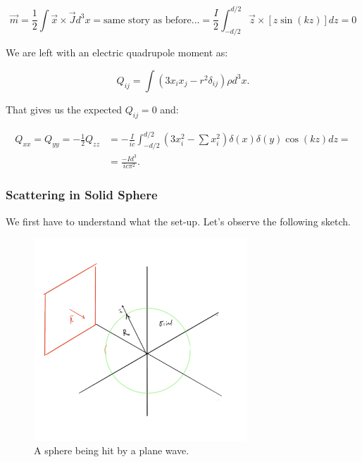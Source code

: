 \begin{equation}
	\vec{m}=\frac{1}{2} \int \vec{x} \times \vec{J} d^{3} x= \text{same story as before...}=\frac{I}{2} \int_{-d / 2}^{d / 2} \vec{z} \times[\hat{z} \sin (k z)] d z=0
\end{equation}

We are left with an electric quadrupole moment as:

\begin{equation}
	Q_{i j}=\int\left(3 x_{i} x_{j}-r^{2} \delta_{i j}\right) \rho d^{3} x.
\end{equation}

That gives us the expected $Q_{ij} = 0$ and:

\begin{equation}
	\begin{split}
		Q_{xx} = Q_{yy} = -\tfrac{1}{2} Q_{zz} &= -\frac{  I}{ic} \int_{-d / 2}^{d / 2} (3x_{i}^{2} - \sum x_{i}^{2})  \delta(x)\delta(y)\cos (k z) d z =\\
		&= \frac{- I d^{3}}{i c \pi^{2}}.
	\end{split}
\end{equation}




\subsubsection{Scattering in Solid Sphere}\label{Scattering in Solid Sphere}

We first have to understand what the set-up. Let's observe the following sketch.

\begin{figure}[h]
	\includegraphics[width=8cm]{figures/Scatteringsphere.png}
	\centering
	\caption{A sphere being hit by a plane wave.}
\end{figure}

